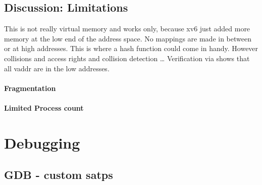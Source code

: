 \subsection{Discussion: Limitations}
This is not really virtual memory and works only, because xv6 just added more memory at the low
end of the address space. No mappings are made in between or at high addresses.
This is where a hash function could come in handy. However collisions and access rights and
collision detection \ldots
Verification via %
shows that all vaddr are in the low addresses.
\paragraph*{Fragmentation}
\paragraph*{Limited Process count}




\section{Debugging}
\subsection{ GDB - custom satps}